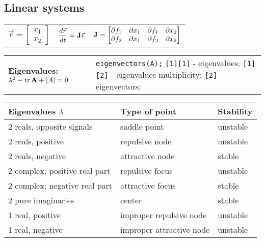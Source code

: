 \documentclass{form}
\begin{document}
\subsection*{Linear systems}
\begin{center} \begin{tabular}{P{62mm} P{62mm} P{62mm}}
    $\displaystyle \vec{r} = \begin{bmatrix}
        x_1 \\
        x_2
    \end{bmatrix}$ &
    $\displaystyle \frac{d\vec{r}}{dt} = \mathbf{J}\vec{r}$ &
    $\displaystyle \mathbf{J} = \begin{bmatrix}
        \partial f_1 & \partial x_1 & \partial f_1 & \partial x_2 \\
        \partial f_2 & \partial x_1 & \partial f_2 & \partial x_2 
    \end{bmatrix}$
\end{tabular} \end{center}
\begin{center} \begin{tabular}{p{75mm} p{115mm}}
    \textbf{Eigenvalues:} $\lambda^2 - \operatorname{tr}{\mathbf{A}} + |A| = 0$
    &
    \texttt{eigenvectors(A);} \texttt{[1][1]} - eigenvalues; \texttt{[1][2]} - eigenvalues multiplicity; \texttt{[2]} - eigenvectors;
\end{tabular} \end{center}
\begin{center} \begin{tabular}{p{65mm} p{65mm} p{55mm}} \hline \hline
    \textbf{Eigenvalues $\lambda$} & \textbf{Type of point} & \textbf{Stability} \\ \hline
    2 reals, opposite signals & saddle point & unstable \\
    2 reals, positive & repulsive node & unstable \\
    2 reals, negative & attractive node & stable \\
    2 complex; positive real part & repulsive focus & unstable \\
    2 complex; negative real part & attractive focus & stable \\
    2 pure imaginaries & center & stable \\
    1 real, positive & improper repulsive node & unstable \\
    1 real, negative & improper attractive node & unstable \\ \hline \hline
\end{tabular} \end{center}
\end{document}
